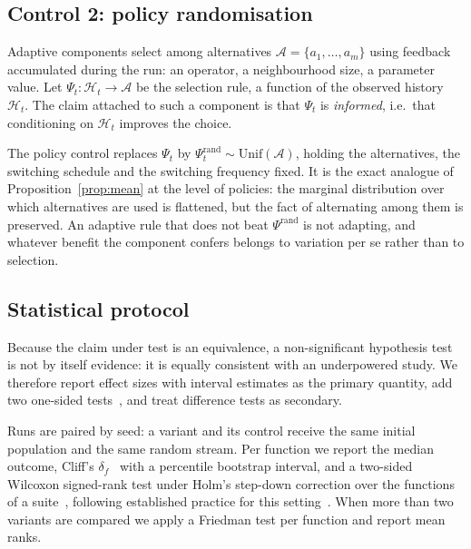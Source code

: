 \subsection{Control 2: policy randomisation}
\label{sec:rand}

Adaptive components select among alternatives $\mathcal{A}=\{a_1,\dots,a_m\}$
using feedback accumulated during the run: an operator, a neighbourhood size,
a parameter value. Let $\Psi_t : \mathcal{H}_t \to \mathcal{A}$ be the
selection rule, a function of the observed history $\mathcal{H}_t$. The claim
attached to such a component is that $\Psi_t$ is \emph{informed}, i.e.\ that
conditioning on $\mathcal{H}_t$ improves the choice.

The policy control replaces $\Psi_t$ by $\Psi^{\mathrm{rand}}_t \sim
\mathrm{Unif}(\mathcal{A})$, holding the alternatives, the switching schedule
and the switching frequency fixed. It is the exact analogue of
Proposition~\ref{prop:mean} at the level of policies: the marginal
distribution over which alternatives are used is flattened, but the fact of
alternating among them is preserved. An adaptive rule that does not beat
$\Psi^{\mathrm{rand}}$ is not adapting, and whatever benefit the component
confers belongs to variation per se rather than to selection.

\subsection{Statistical protocol}
\label{sec:stats}

Because the claim under test is an equivalence, a non-significant hypothesis
test is not by itself evidence: it is equally consistent with an underpowered
study. We therefore report effect sizes with interval estimates as the primary
quantity, add two one-sided
tests~\cite{schuirmann1987comparison,lakens2017equivalence}, and treat
difference tests as secondary.

Runs are paired by seed: a variant and its control receive the same initial
population and the same random stream. Per function we report the median
outcome, Cliff's $\delta_f$~\cite{cliff1993dominance} with a percentile
bootstrap interval, and a two-sided Wilcoxon signed-rank test under Holm's
step-down correction over the functions of a suite~\cite{holm1979simple},
following established practice for this
setting~\cite{derrac2011practical,garcia2009study}. When more than two variants
are compared we apply a Friedman test per function and report mean ranks.


